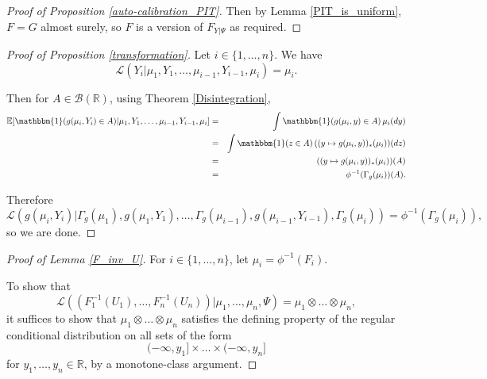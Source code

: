 \documentclass[aap]{imsart}
\theoremstyle{plain}
\theoremstyle{definition}
\begin{document}
\begin{appendix}
\begin{proof}[Proof of Proposition \ref{auto-calibration_PIT}]
  Then by Lemma \ref{PIT_is_uniform}, $F = G$ almost surely, so $F$ is a version of $F_{Y|\Psi}$ as required.
\end{proof}

\begin{proof}[Proof of Proposition \ref{transformation}]
  Let $i \in \{1, \ldots, n\}$. We have
\begin{equation*}
  \mathcal{L}(Y_i|\mu_1, Y_1, \ldots, \mu_{i-1}, Y_{i-1}, \mu_i) = \mu_i.
\end{equation*}

  Then for $A \in \mathcal{B}(\mathbb{R})$, using Theorem \ref{Disintegration},
\begin{eqnarray*}
\mathbb{E}[\mathbbm{1}(g(\mu_i,Y_i) \in A)|\mu_1, Y_1, \ldots, \mu_{i-1}, Y_{i-1}, \mu_i] & = & \int \mathbbm{1}(g(\mu_i,y) \in A) \,\mu_i(dy) \\
    & = & \int \mathbbm{1}(z \in A) \,((y \mapsto g(\mu_i,y))_*(\mu_i))(dz) \\
    & = & ((y \mapsto g(\mu_i,y))_*(\mu_i))(A) \\
    & = & \phi^{-1}(\Gamma_g(\mu_i))(A).
\end{eqnarray*}

Therefore
\begin{equation*}
  \mathcal{L}(g(\mu_i,Y_i)|\Gamma_g(\mu_1), g(\mu_1,Y_1), \ldots, \Gamma_g(\mu_{i-1}), g(\mu_{i-1},Y_{i-1}), \Gamma_g(\mu_i)) = \phi^{-1}(\Gamma_g(\mu_i)),
\end{equation*}
so we are done.
\end{proof}

\begin{proof}[Proof of Lemma \ref{F_inv_U}]
  For $i \in \{1, \ldots, n\}$, let $\mu_i = \phi^{-1}(F_i)$.

  To show that
\begin{equation*}
  \mathcal{L}((F_1^{-1}(U_1), \ldots, F_n^{-1}(U_n))|\mu_1, \ldots, \mu_n, \Psi) = \mu_1 \otimes \ldots \otimes \mu_n,
\end{equation*}
it suffices to show that $\mu_1 \otimes \ldots \otimes \mu_n$ satisfies the defining property of the regular conditional distribution on all sets of the form
\begin{equation*}
  (-\infty,y_1] \times \ldots \times (-\infty,y_n]
\end{equation*}
  for $y_1, \ldots, y_n \in \mathbb{R}$, by a monotone-class argument.


\end{proof}
\end{appendix}
\end{document}
